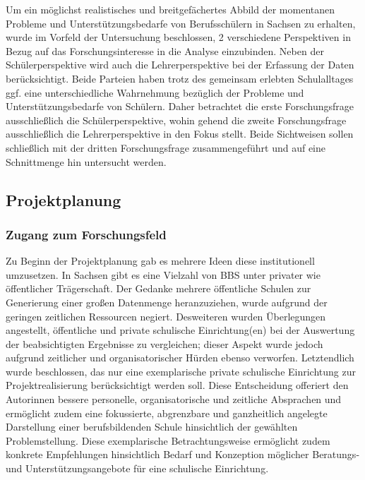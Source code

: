 Um ein möglichst realistisches und breitgefächertes Abbild der momentanen Probleme und Unterstützungsbedarfe von Berufsschülern in Sachsen zu erhalten, wurde im Vorfeld der Untersuchung beschlossen, 2 verschiedene Perspektiven in Bezug auf das Forschungsinteresse in die Analyse einzubinden. Neben der Schülerperspektive wird auch die Lehrerperspektive bei der Erfassung der Daten berücksichtigt. Beide Parteien haben trotz des gemeinsam erlebten Schulalltages ggf. eine unterschiedliche Wahrnehmung bezüglich der Probleme und Unterstützungsbedarfe von Schülern. Daher betrachtet die erste Forschungsfrage ausschließlich die Schülerperspektive, wohin gehend die zweite Forschungsfrage ausschließlich die Lehrerperspektive in den Fokus stellt. Beide Sichtweisen sollen schließlich mit der dritten Forschungsfrage zusammengeführt und auf eine Schnittmenge hin untersucht werden.

\subsection{Projektplanung}
\label{sec:Projektplanung}

\subsubsection{Zugang zum Forschungsfeld}
\label{sec:ZugangZumForschungsfeld}

Zu Beginn der Projektplanung gab es mehrere Ideen diese institutionell umzusetzen. In Sachsen gibt es eine Vielzahl von BBS unter privater wie öffentlicher Trägerschaft. Der Gedanke mehrere öffentliche Schulen zur Generierung einer großen Datenmenge heranzuziehen, wurde aufgrund der geringen zeitlichen Ressourcen negiert. Desweiteren wurden Überlegungen angestellt, öffentliche und private schulische Einrichtung(en) bei der Auswertung der beabsichtigten Ergebnisse zu vergleichen; dieser Aspekt wurde jedoch aufgrund zeitlicher und organisatorischer Hürden ebenso verworfen. Letztendlich wurde beschlossen, das nur eine exemplarische private schulische Einrichtung zur Projektrealisierung berücksichtigt werden soll. Diese Entscheidung offeriert den Autorinnen bessere personelle, organisatorische und zeitliche Absprachen und ermöglicht zudem eine fokussierte, abgrenzbare und ganzheitlich angelegte Darstellung einer berufsbildenden Schule hinsichtlich der gewählten Problemstellung. Diese exemplarische  Betrachtungsweise ermöglicht zudem konkrete Empfehlungen hinsichtlich Bedarf und Konzeption möglicher Beratungs- und Unterstützungsangebote für eine schulische Einrichtung.

